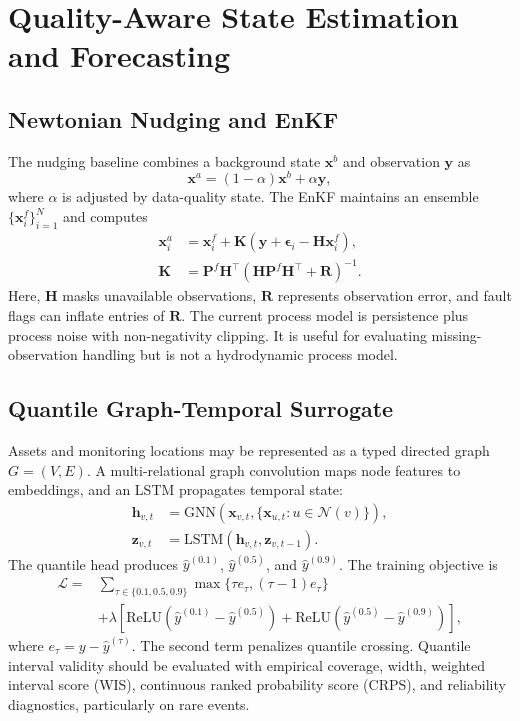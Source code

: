 \documentclass[journal]{IEEEtran}
\begin{document}
\section{Quality-Aware State Estimation and Forecasting}
\subsection{Newtonian Nudging and EnKF}
The nudging baseline combines a background state $\mathbf{x}^{b}$ and observation $\mathbf{y}$ as
\begin{equation}
\mathbf{x}^{a}=(1-\alpha)\mathbf{x}^{b}+\alpha\mathbf{y},
\label{eq:nudge}
\end{equation}
where $\alpha$ is adjusted by data-quality state. The EnKF maintains an ensemble $\{\mathbf{x}_i^f\}_{i=1}^{N}$ and computes
\begin{align}
\mathbf{x}_i^a &= \mathbf{x}_i^f+\mathbf{K}(\mathbf{y}+\boldsymbol{\epsilon}_i-\mathbf{H}\mathbf{x}_i^f),\\
\mathbf{K} &= \mathbf{P}^f\mathbf{H}^{\top}(\mathbf{H}\mathbf{P}^f\mathbf{H}^{\top}+\mathbf{R})^{-1}.
\label{eq:enkf}
\end{align}
Here, $\mathbf{H}$ masks unavailable observations, $\mathbf{R}$ represents observation error, and fault flags can inflate entries of $\mathbf{R}$. The current process model is persistence plus process noise with non-negativity clipping. It is useful for evaluating missing-observation handling but is not a hydrodynamic process model.

\subsection{Quantile Graph-Temporal Surrogate}
Assets and monitoring locations may be represented as a typed directed graph $G=(V,E)$. A multi-relational graph convolution maps node features to embeddings, and an LSTM propagates temporal state:
\begin{align}
\mathbf{h}_{v,t}&=\mathrm{GNN}(\mathbf{x}_{v,t},\{\mathbf{x}_{u,t}:u\in\mathcal{N}(v)\}),\\
\mathbf{z}_{v,t}&=\mathrm{LSTM}(\mathbf{h}_{v,t},\mathbf{z}_{v,t-1}).
\end{align}
The quantile head produces $\hat y^{(0.1)}$, $\hat y^{(0.5)}$, and $\hat y^{(0.9)}$. The training objective is
\begin{align}
\mathcal{L}=&\sum_{\tau\in\{0.1,0.5,0.9\}}\max\{\tau e_\tau,(\tau-1)e_\tau\}\\
&+\lambda\left[\mathrm{ReLU}(\hat y^{(0.1)}-\hat y^{(0.5)})+\mathrm{ReLU}(\hat y^{(0.5)}-\hat y^{(0.9)})\right],
\label{eq:pinball}
\end{align}
where $e_\tau=y-\hat y^{(\tau)}$. The second term penalizes quantile crossing. Quantile interval validity should be evaluated with empirical coverage, width, weighted interval score (WIS), continuous ranked probability score (CRPS), and reliability diagnostics, particularly on rare events.
\end{document}
